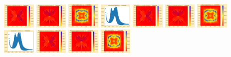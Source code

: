 \documentclass[11pt]{article}
\begin{document}
\includegraphics[width=0.11875\textwidth]{frame0076fig2.png}
\includegraphics[width=0.11875\textwidth]{frame0076fig3.png}
\includegraphics[width=0.11875\textwidth]{frame0077fig0.png}
\includegraphics[width=0.11875\textwidth]{frame0077fig1.png}
\includegraphics[width=0.11875\textwidth]{frame0077fig2.png}
\includegraphics[width=0.11875\textwidth]{frame0077fig3.png}
\vskip 10pt 
\includegraphics[width=0.11875\textwidth]{frame0078fig0.png}
\includegraphics[width=0.11875\textwidth]{frame0078fig1.png}
\includegraphics[width=0.11875\textwidth]{frame0078fig2.png}
\includegraphics[width=0.11875\textwidth]{frame0078fig3.png}
\includegraphics[width=0.11875\textwidth]{frame0079fig0.png}
\end{document}
